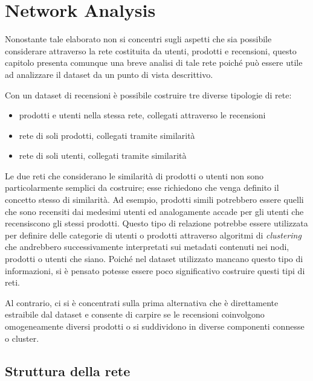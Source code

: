 \documentclass[hidelinks, 12pt]{article}
\begin{document}
\section{Network Analysis}
\label{sec:network-anal}


Nonostante tale elaborato non si concentri sugli aspetti che sia possibile considerare attraverso la rete costituita da utenti, prodotti e recensioni, questo capitolo presenta comunque una breve analisi di tale rete poiché può essere utile ad analizzare il dataset da un punto di vista descrittivo.

\vspace{3ex}

Con un dataset di recensioni è possibile costruire tre diverse tipologie di rete:

\begin{itemize}
	\item prodotti e utenti nella stessa rete, collegati attraverso le recensioni
	\item rete di soli prodotti, collegati tramite similarità
	\item rete di soli utenti, collegati tramite similarità
\end{itemize}

Le due reti che considerano le similarità di prodotti o utenti non sono particolarmente semplici da costruire; esse richiedono che venga definito il concetto stesso di similarità. Ad esempio, prodotti simili potrebbero essere quelli che sono recensiti dai medesimi utenti ed analogamente accade per gli utenti che recensiscono gli stessi prodotti. Questo tipo di relazione potrebbe essere utilizzata per definire delle categorie di utenti o prodotti attraverso algoritmi di \textit{clustering} che andrebbero successivamente interpretati sui metadati contenuti nei nodi, prodotti o utenti che siano. Poiché nel dataset utilizzato mancano questo tipo di informazioni, si è pensato potesse essere poco significativo costruire questi tipi di reti.

Al contrario, ci si è concentrati sulla prima alternativa che è direttamente estraibile dal dataset e consente di carpire se le recensioni coinvolgono omogeneamente diversi prodotti o si suddividono in diverse componenti connesse o cluster.



\subsection{Struttura della rete}
\end{document}
